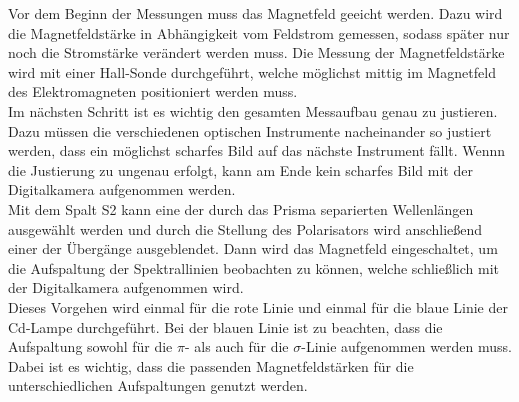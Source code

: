 Vor dem Beginn der Messungen muss das Magnetfeld geeicht werden. Dazu wird die Magnetfeldstärke in Abhängigkeit vom Feldstrom gemessen, sodass später nur noch die Stromstärke verändert werden muss. Die Messung der Magnetfeldstärke wird mit einer Hall-Sonde durchgeführt, welche möglichst mittig im Magnetfeld des Elektromagneten positioniert werden muss. \\
\newline
Im nächsten Schritt ist es wichtig den gesamten Messaufbau genau zu justieren. Dazu müssen die verschiedenen optischen Instrumente nacheinander so justiert werden, dass ein möglichst scharfes Bild auf das nächste Instrument fällt. Wennn die Justierung zu ungenau erfolgt, kann am Ende kein scharfes Bild mit der Digitalkamera aufgenommen werden. \\
\newline
Mit dem Spalt S2 kann eine der durch das Prisma separierten Wellenlängen ausgewählt werden und durch die Stellung des Polarisators wird anschließend einer der Übergänge ausgeblendet. Dann wird das Magnetfeld eingeschaltet, um die Aufspaltung der Spektrallinien beobachten zu können, welche schließlich mit der Digitalkamera aufgenommen wird. \\
Dieses Vorgehen wird einmal für die rote Linie und einmal für die blaue Linie der Cd-Lampe durchgeführt. Bei der blauen Linie ist zu beachten, dass die Aufspaltung sowohl für die $\pi$- als auch für die $\sigma$-Linie aufgenommen werden muss. Dabei ist es wichtig, dass die passenden Magnetfeldstärken für die unterschiedlichen Aufspaltungen genutzt werden. 